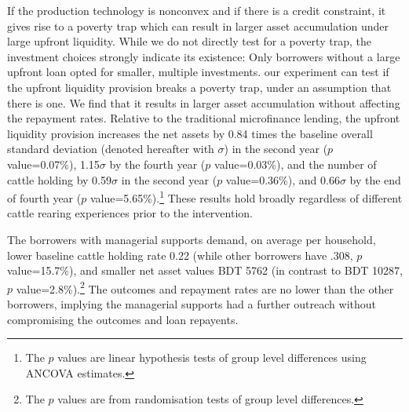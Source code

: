 	If the production technology is nonconvex and if there is a credit constraint, it gives rise to a poverty trap which can result in larger asset accumulation under large upfront liquidity. While we do not directly test for a poverty trap, the investment choices strongly indicate its existence: Only borrowers without a large upfront loan opted for smaller, multiple investments.  our experiment can test if the upfront liquidity provision breaks a poverty trap, under an assumption that there is one. We find that it results in larger asset accumulation without affecting the repayment rates. Relative to the traditional microfinance lending, the upfront liquidity provision increases the net assets by 
	0.84 times the baseline overall standard deviation (denoted hereafter with $\sigma$) in the second year ($p$ value=0.07\%), 
	1.15$\sigma$ by the fourth year ($p$ value=0.03\%), 
	and the number of cattle holding by 0.59$\sigma$ in the second year ($p$ value=0.36\%), and 
	0.66$\sigma$ by the end of fourth year ($p$ value=5.65\%).\footnote{The $p$ values are linear hypothesis tests of group level differences using ANCOVA estimates. } These results hold broadly regardless of different cattle rearing experiences prior to the intervention. 


	 The borrowers with managerial supports demand, on average per household, lower baseline cattle holding rate 0.22 (while other borrowers have .308, $p$ value=15.7\%), and smaller net asset values BDT 5762 (in contrast to BDT 10287, $p$ value=2.8\%).\footnote{The $p$ values are from randomisation tests of group level differences. } The outcomes and repayment rates are no lower than the other borrowers, implying the managerial supports had a further outreach without compromising the outcomes and loan repayents. 

